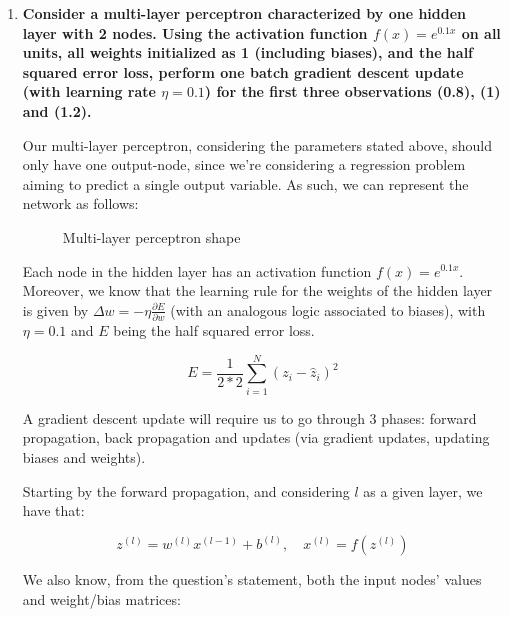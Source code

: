 \documentclass[12pt]{article}
\begin{document}
\begin{enumerate}[leftmargin=\labelsep]
        \pagebreak

  \item \textbf{Consider a multi-layer perceptron characterized by one hidden layer with 2 nodes.
          Using the activation function $f(x) = e^{0.1x}$ on all units, all weights
          initialized as 1 (including biases), and the half squared error loss, perform
          one batch gradient descent update (with learning rate $\eta = 0.1$)
          for the first three observations (0.8), (1) and (1.2).
        }

        Our multi-layer perceptron, considering the parameters stated above, should only
        have one output-node, since we're considering a regression problem aiming to
        predict a single output variable. As such, we can represent the network as follows:

        \begin{figure}[H]
          \centering
          
          \caption{Multi-layer perceptron shape}
        \end{figure}

        Each node in the hidden layer has an activation function $f(x) = e^{0.1x}$.
        Moreover, we know that the learning rule for the weights of the hidden layer
        is given by $\Delta w = - \eta \frac{\partial E}{\partial w}$ (with an analogous
        logic associated to biases), with $\eta = 0.1$ and $E$ being the half squared error loss.

        \begin{equation*}
          E = \frac{1}{2 * 2} \sum_{i=1}^N (z_i - \hat{z}_i)^2
        \end{equation*}

        A gradient descent update will require us to go through 3 phases: forward
        propagation, back propagation and updates (via gradient updates, updating
        biases and weights).

        Starting by the forward propagation, and considering $l$ as a given layer,
        we have that:

        \begin{equation*}
          z^{(l)} = w^{(l)} x^{(l - 1)} + b^{(l)}, \quad x^{(l)} = f(z^{(l)})
        \end{equation*}

        \pagebreak

        We also know, from the question's statement, both the input nodes' values
        and weight/bias matrices:


\end{enumerate}
\end{document}
